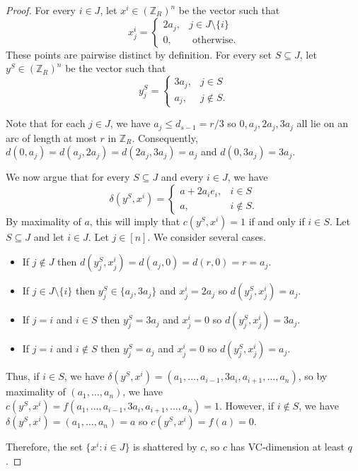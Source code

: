 \documentclass[11pt]{article}
\theoremstyle{remark}
\begin{document}
\begin{proof}
    For every $i \in J$, let $x^i \in (\mathbb{Z}_{R})^n$ be the vector such that \[x^i_j = \begin{cases}
      2a_j, &j \in J \setminus \{i\} \\
      0, & \text{ otherwise}.
    \end{cases}\]
    These points are pairwise distinct by definition.
    For every set $S \subseteq J$, let $y^S\in (\mathbb{Z}_{R})^n$ be the vector such that \[y^S_j = \begin{cases}
      3a_j, &j \in S \\
      a_j, &j \notin S.
    \end{cases}\]
    
    Note that for each $j \in J$, we have $a_j \leq d_{s-1} = r/3$ so $0, a_j, 2a_j, 3a_j$ all lie on an arc of length at most $r$ in $\mathbb{Z}_R$. Consequently, $d(0, a_j) = d(a_j, 2a_j) = d(2a_j, 3a_j) = a_j$ and $d(0, 3a_j) = 3a_j$.
    
    We now argue that for every $S \subseteq J$ and every $i \in J$, we have \[\delta(y^S, x^i) = \begin{cases}
        a+2a_ie_i, &i \in S \\
        a, &i \notin S.
    \end{cases}\] 
    By maximality of $a$, this will imply that $c(y^S, x^i) = 1$ if and only if $i \in S$.
    Let $S \subseteq J$ and let $i \in J$.
    Let $j \in [n]$. We consider several cases. \begin{itemize}
        \item If $j \notin J$ then $d(y^S_j, x^i_j) = d(a_j, 0) = d(r, 0) = r = a_j$.
        \item If $j \in J \setminus \{i\}$ then $y^S_j \in \{a_j, 3a_j\}$ and $x^i_j = 2a_j$ so $d(y^S_j, x^i_j) = a_j$.
        \item If $j = i$ and $i \in S$ then $y^S_j = 3a_j$ and $x^i_j = 0$ so $d(y^S_j, x^i_j) = 3a_j$.
        \item If $j=i$ and $i \notin S$ then $y^S_j = a_j$ and $x^i_j = 0$ so $d(y^S_j, x^i_j) = a_j$.
    \end{itemize}
    
    Thus, if $i \in S$, we have $\delta(y^S, x^i) = (a_1, \ldots, a_{i-1}, 3a_i, a_{i+1}, \ldots, a_n)$, so by maximality of $(a_1, \ldots, a_n)$, we have $c(y^S, x^i) = f(a_1, \ldots, a_{i-1}, 3a_i, a_{i+1}, \ldots, a_n) = 1$.
    However, if $i \notin S$, we have $\delta(y^S, x^i) = (a_1, \ldots, a_n) = a$ so $c(y^S, x^i) = f(a) = 0$.
    
    Therefore, the set $\{x^i : i \in J\}$ is shattered by $c$, so $c$ has VC-dimension at least $q$.
\end{proof}
\end{document}
